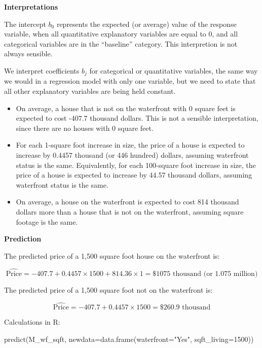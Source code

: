 \documentclass[
  letterpaper,
  DIV=11,
  numbers=noendperiod]{scrreprt}
\newenvironment{Shaded}{\begin{snugshade}}{\end{snugshade}}
\newcommand{\AttributeTok}[1]{\textcolor[rgb]{0.40,0.45,0.13}{#1}}
\newcommand{\DecValTok}[1]{\textcolor[rgb]{0.68,0.00,0.00}{#1}}
\newcommand{\FunctionTok}[1]{\textcolor[rgb]{0.28,0.35,0.67}{#1}}
\newcommand{\NormalTok}[1]{\textcolor[rgb]{0.00,0.23,0.31}{#1}}
\newcommand{\StringTok}[1]{\textcolor[rgb]{0.13,0.47,0.30}{#1}}
\begin{document}
\textbf{Interpretations}

The intercept \(b_0\) represents the expected (or average) value of the
response variable, when all quantitative explanatory variables are equal
to 0, and all categorical variables are in the ``baseline'' category.
This interpretion is not always sensible.

We interpret coefficients \(b_j\) for categorical or quantitative
variables, the same way we would in a regression model with only one
variable, but we need to state that all other explanatory variables are
being held constant.

\begin{itemize}
\item
  On average, a house that is not on the waterfront with 0 square feet
  is expected to cost -407.7 thousand dollars. This is not a sensible
  interpretation, since there are no houses with 0 square feet.\\
\item
  For each 1-square foot increase in size, the price of a house is
  expected to increase by 0.4457 thousand (or 446 hundred) dollars,
  assuming waterfront status is the same. Equivalently, for each
  100-square foot increase in size, the price of a house is expected to
  increase by 44.57 thousand dollars, assuming waterfront status is the
  same.
\item
  On average, a house on the waterfront is expected to cost 814 thousand
  dollars more than a house that is not on the waterfront, assuming
  square footage is the same.
\end{itemize}

\textbf{Prediction}

The predicted price of a 1,500 square foot house on the waterfront is:

\[
\widehat{\text{Price}} = -407.7 + 0.4457\times1500 + 814.36\times1 = \$1075{ \text{ thousand (or 1.075 million)}}
\]

The predicted price of a 1,500 square foot not on the waterfront is:

\[
\widehat{\text{Price}} = -407.7 + 0.4457\times1500 = \$260.9{ \text{ thousand}}
\]

Calculations in R:

\begin{Shaded}
\begin{Highlighting}[]
\FunctionTok{predict}\NormalTok{(M\_wf\_sqft, }\AttributeTok{newdata=}\FunctionTok{data.frame}\NormalTok{(}\AttributeTok{waterfront=}\StringTok{"Yes"}\NormalTok{, }\AttributeTok{sqft\_living=}\DecValTok{1500}\NormalTok{))}
\end{Highlighting}
\end{Shaded}
\end{document}
